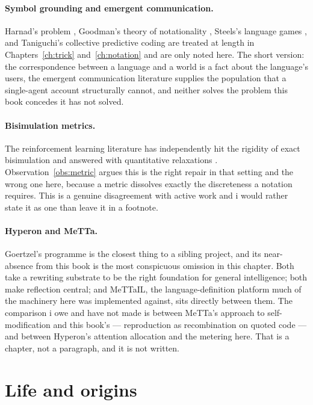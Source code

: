 \paragraph{Symbol grounding and emergent communication.}
Harnad's problem \cite{harnad1990}, Goodman's theory of
notationality \cite{goodman1968}, Steels's language games
\cite{steels2015}, and Taniguchi's collective predictive coding
\cite{taniguchi2024} are treated at length in
Chapters~\ref{ch:trick} and~\ref{ch:notation} and are only noted
here.
The short version: the correspondence between a language and a
world is a fact about the language's users, the emergent
communication literature supplies the population that a
single-agent account structurally cannot, and neither solves the
problem this book concedes it has not solved.

\paragraph{Bisimulation metrics.}
The reinforcement learning literature has independently hit the
rigidity of exact bisimulation and answered with quantitative
relaxations \cite{ferns2004,gelada2019,zhang2021,castro2021}.
Observation~\ref{obs:metric} argues this is the right repair in
that setting and the wrong one here, because a metric dissolves
exactly the discreteness a notation requires.
This is a genuine disagreement with active work and i would rather
state it as one than leave it in a footnote.

\paragraph{Hyperon and MeTTa.}
Goertzel's programme \cite{goertzel2021} is the closest thing to a
sibling project, and its near-absence from this book is the most
conspicuous omission in this chapter.
Both take a rewriting substrate to be the right foundation for
general intelligence; both make reflection central; and MeTTaIL,
the language-definition platform much of the machinery here was
implemented against, sits directly between them.
The comparison i owe and have not made is between MeTTa's
approach to self-modification and this book's --- reproduction as
recombination on quoted code --- and between Hyperon's
attention allocation and the metering here.
That is a chapter, not a paragraph, and it is not written.

\section*{Life and origins}

